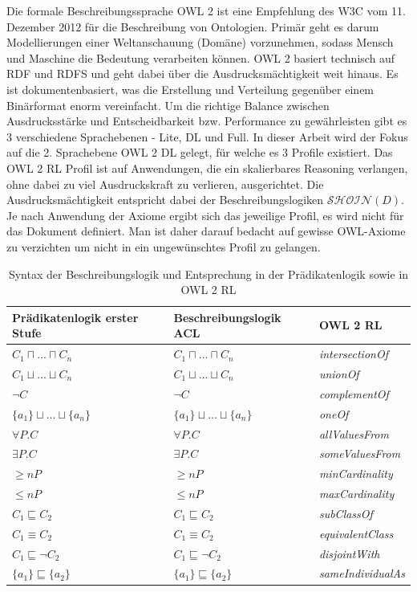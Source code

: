 \documentclass[runningheads,a4paper]{llncs}
\begin{document}
Die formale Beschreibungssprache OWL 2 ist eine Empfehlung des W3C \cite{owl2} vom 11. Dezember 2012 für die Beschreibung von Ontologien. 
Primär geht es darum Modellierungen einer Weltanschauung (Domäne) vorzunehmen, sodass Mensch und Maschine die Bedeutung verarbeiten können. 
OWL 2 basiert technisch auf RDF und RDFS und geht dabei über die Ausdrucksmächtigkeit weit hinaus. 
Es ist dokumentenbasiert, was die Erstellung und Verteilung gegenüber einem Binärformat enorm vereinfacht. 
Um die richtige Balance zwischen Ausdrucksstärke und Entscheidbarkeit bzw. Performance zu gewährleisten gibt es 3 verschiedene Sprachebenen - Lite, DL und Full. 
In dieser Arbeit wird der Fokus auf die 2. Sprachebene OWL 2 DL gelegt, für welche es 3 Profile existiert. 
Das OWL 2 RL Profil ist auf Anwendungen, die ein skalierbares Reasoning verlangen, ohne dabei zu viel Ausdruckskraft zu verlieren, ausgerichtet. 
Die Ausdrucksmächtigkeit entspricht dabei der Beschreibungslogiken \(\mathcal{SHOIN}(D)\). 
Je nach Anwendung der Axiome ergibt sich das jeweilige Profil, es wird nicht für das Dokument definiert. 
Man ist daher darauf bedacht auf gewisse OWL-Axiome zu verzichten um nicht in ein ungewünschtes Profil zu gelangen.
\begin{table}[h]
\begin{tabular}{|l|l|l|}
\hline
Prädikatenlogik erster Stufe & Beschreibungslogik ACL & OWL 2 RL \\ \hline
$ C_1 \sqcap ... \sqcap C_n $ & $ C_1 \sqcap ... \sqcap C_n $ & \textit{intersectionOf} \\ \hline
$ C_1 \sqcup ... \sqcup C_n $ & $ C_1 \sqcup ... \sqcup C_n $ & \textit{unionOf} \\ \hline
$ \neg C $ & $ \neg C $ & \textit{complementOf} \\ \hline
$ \{a_1\} \sqcup ... \sqcup \{a_n\} $ & $ \{a_1\} \sqcup ... \sqcup \{a_n\} $ & \textit{oneOf} \\ \hline
$ \forall P.C $ & $ \forall P.C $ & \textit{allValuesFrom} \\ \hline
$ \exists P.C $ & $ \exists P.C $ & \textit{someValuesFrom} \\ \hline
$ \geq n P $ & $ \geq n P $ & \textit{minCardinality} \\ \hline
$ \leq n P $ & $ \leq n P $ & \textit{maxCardinality} \\ \hline
$ C_1 \sqsubseteq C_2 $ & $ C_1 \sqsubseteq C_2 $ & \textit{subClassOf} \\ \hline
$ C_1 \equiv C_2 $ & $ C_1 \equiv C_2 $ & \textit{equivalentClass} \\ \hline
$ C_1 \sqsubseteq \neg C_2 $ & $ C_1 \sqsubseteq \neg C_2 $ & \textit{disjointWith} \\ \hline
$ \{a_1\} \sqsubseteq \{a_2\} $ & $ \{a_1\} \sqsubseteq \{a_2\} $ & \textit{sameIndividualAs} \\ \hline
\end{tabular}
\label{table:description_logic}
\caption{Syntax der Beschreibungslogik und Entsprechung in der Prädikatenlogik sowie in OWL 2 RL}
\end{table}
\end{document}
